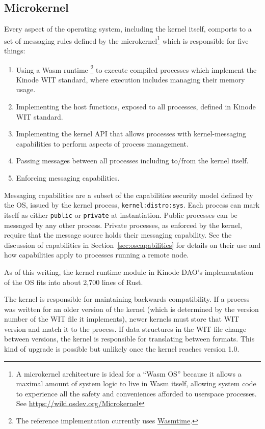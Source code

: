 \documentclass[runningheads]{llncs}
\begin{document}
\subsection{Microkernel}
\label{sec:osmicrokernel}

Every aspect of the operating system, including the kernel itself, comports to a set of messaging rules defined by the microkernel\footnote{A microkernel architecture is ideal for a ``Wasm OS'' because it allows a maximal amount of system logic to live in Wasm itself, allowing system code to experience all the safety and conveniences afforded to userspace processes. See \href{https://wiki.osdev.org/Microkernel}{https://wiki.osdev.org/Microkernel}} which is responsible for five things:
\begin{enumerate}
    \item Using a Wasm runtime
    \footnote{The reference implementation currently uses \href{https://wasmtime.dev}{Wasmtime}.}
    to execute compiled processes which implement the Kinode WIT standard, where execution includes managing their memory usage.
    \item Implementing the host functions, exposed to all processes, defined in Kinode WIT standard.
    \item Implementing the kernel API that allows processes with kernel-messaging capabilities to perform aspects of process management.
    \item Passing messages between all processes including to/from the kernel itself.
    \item Enforcing messaging capabilities.
\end{enumerate}

Messaging capabilities are a subset of the capabilities security model defined by the OS, issued by the kernel process, \verb|kernel:distro:sys|.
Each process can mark itself as either \verb|public| or \verb|private| at instantiation.
Public processes can be messaged by any other process.
Private processes, as enforced by the kernel, require that the message source holds their messaging capability.
See the discussion of capabilities in Section~\ref{sec:oscapabilities} for details on their use and how capabilities apply to processes running a remote node.

As of this writing, the kernel runtime module in Kinode DAO's implementation of the OS fits into about 2,700 lines of Rust.

The kernel is responsible for maintaining backwards compatibility.
If a process was written for an older version of the kernel (which is determined by the version number of the WIT file it implements), newer kernels must store that WIT version and match it to the process.
If data structures in the WIT file change between versions, the kernel is responsible for translating between formats.
This kind of upgrade is possible but unlikely once the kernel reaches version 1.0.
\end{document}
